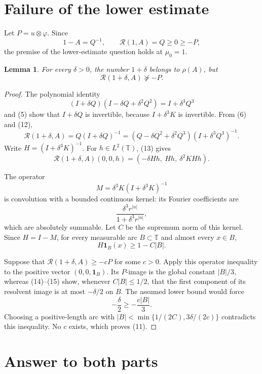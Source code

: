 \documentclass[11pt]{article}
\newtheorem{lemma}{Lemma}
\theoremstyle{remark}
\newcommand{\T}{\mathbb T}
\newcommand{\one}{\mathbf 1}
\newcommand{\R}{\mathcal R}
\newcommand{\rhoA}{\rho}
\begin{document}
\section{Failure of the lower estimate}

Let $P=u\otimes\varphi$.  Since
\[
 1-A=Q^{-1},\qquad \R(1,A)=Q\geq0\geq-P,                  \tag{10}
\]
the premise of the lower-estimate question holds at $\mu_0=1$.

\begin{lemma}\label{lem:failure}
For every $\delta>0$, the number $1+\delta$ belongs to $\rhoA(A)$, but
\[
 \R(1+\delta,A)\not\succeq-P.                             \tag{11}
\]
\end{lemma}

\begin{proof}
The polynomial identity
\[
 (I+\delta Q)(I-\delta Q+\delta^2Q^2)=I+\delta^3Q^3       \tag{12}
\]
and (5) show that $I+\delta Q$ is invertible, because
$I+\delta^3K$ is invertible.  From (6) and (12),
\[
 \R(1+\delta,A)
  =Q(I+\delta Q)^{-1}
  =(Q-\delta Q^2+\delta^2Q^3)(I+\delta^3Q^3)^{-1}.         \tag{13}
\]
Write $H=(I+\delta^3K)^{-1}$.  For $h\in L^2(\T)$, (13) gives
\[
 \R(1+\delta,A)(0,0,h)
   =(-\delta Hh,\ Hh,\ \delta^2KHh).                       \tag{14}
\]

The operator
\[
 M=\delta^3K(I+\delta^3K)^{-1}
\]
is convolution with a bounded continuous kernel: its Fourier coefficients are
\[
 \frac{\delta^3 r^{|n|}}{1+\delta^3r^{|n|}},
\]
which are absolutely summable.  Let $C$ be the supremum norm of this kernel.
Since $H=I-M$, for every measurable arc $B\subset\T$ and almost every $x\in B$,
\[
 H\one_B(x)\geq 1-C|B|.                                   \tag{15}
\]

Suppose that $\R(1+\delta,A)\geq-cP$ for some $c>0$.  Apply this operator
inequality to the positive vector $(0,0,\one_B)$.  Its $P$-image is the global
constant $|B|/3$, whereas (14)--(15) show, whenever $C|B|\leq1/2$, that the
first component of its resolvent image is at most $-\delta/2$ on $B$.  The
assumed lower bound would force
\[
 -\frac{\delta}{2}\geq-\frac{c|B|}{3}.
\]
Choosing a positive-length arc with
$|B|<\min\{1/(2C),3\delta/(2c)\}$ contradicts this inequality.  No $c$ exists,
which proves (11).
\end{proof}

\section{Answer to both parts}
\end{document}
